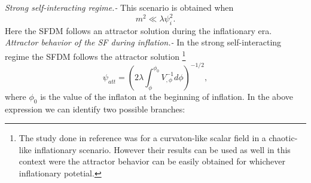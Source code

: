 \documentclass[amssymb,twocolumn,prd,nofootinbib,showpacs]{revtex4-1}
\begin{document}
\textit{Strong self-interacting regime.-} This scenario is obtained when 
\begin{equation}
m^2\ll \lambda\psi_i^2.
\end{equation}
%
Here the SFDM follows an attractor solution during the inflationary era.
\\

\textit{Attractor behavior of the SF during inflation.-} In the strong self-interacting regime the SFDM follows the 
attractor solution \cite{curvatonatractor}\footnote{The study done in reference \cite{curvatonatractor} was for a curvaton-like scalar field in a chaotic-like inflationary scenario. However their results can be used as well in this context were the attractor behavior can be easily obtained for whichever inflationary potetial.}
\begin{equation}\label{atractor}
\psi_{att} =\left(2\lambda\int_{\phi}^{\phi_0}V^{-1}_{,\phi}d\phi\right)^{-1/2},
\end{equation}
where $\phi_0$ is the value of the inflaton at the beginning of inflation. 
In the above expression we can identify two possible branches:
\end{document}
